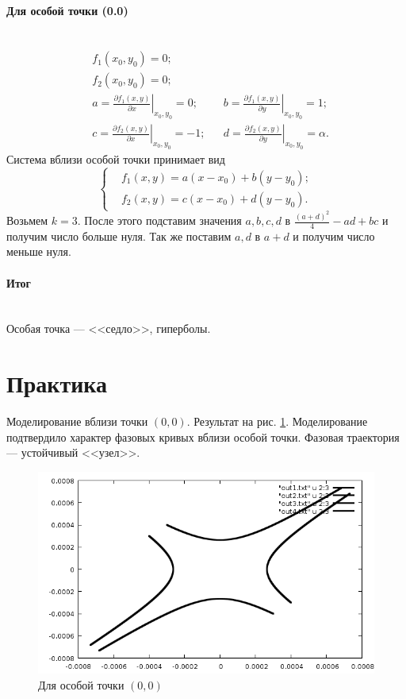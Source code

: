 \documentclass[14pt]{extarticle}
\begin{document}
\paragraph{Для особой точки (0.0)}$\quad$\\
\begin{equation}
  \begin{aligned}
    &f_1(x_0,y_0)=0;\\
    &f_2(x_0,y_0)=0;\\
    &a = \left.\frac{\partial f_1(x,y)}{\partial x}\right|_{x_0,y_0} = 0; && b = \left.\frac{\partial f_1(x,y)}{\partial y}\right|_{x_0,y_0} = 1;\\
    &c = \left.\frac{\partial f_2(x,y)}{\partial x}\right|_{x_0,y_0} =-1; && d = \left.\frac{\partial f_2(x,y)}{\partial y}\right|_{x_0,y_0} = \alpha.
  \end{aligned}
\end{equation}
Система вблизи особой точки принимает вид
\begin{equation}
  \left\lbrace
  \begin{aligned}
    &f_1(x,y) = a(x-x_0)+b(y-y_0);\\
    &f_2(x,y) = c(x-x_0)+d(y-y_0).
  \end{aligned}
  \right.
\end{equation}
Возьмем $k=3$. После этого подставим значения $a, b, c, d$ в $\frac{(a+d)^2}{4}-ad+bc$ и получим число больше нуля. Так же поставим $a, d$ в $a+d$ и получим число меньше нуля.
\paragraph{Итог}$\quad$\\
Особая точка --- <<седло>>, гиперболы.

\newpage
\section{Практика}

Моделирование вблизи точки $(0,0)$. Результат на рис. \ref{first}. Моделирование подтвердило характер фазовых кривых вблизи особой точки. Фазовая траектория --- устойчивый <<узел>>.
\begin{figure}[!h]
  \centering
  \includegraphics[width=1\textwidth]{all.png}
  \caption{Для особой точки $(0,0)$\label{first}}
\end{figure}
\end{document}
